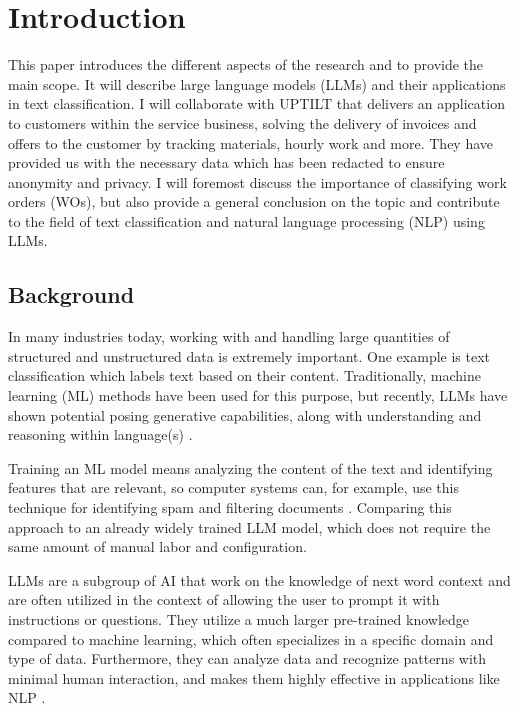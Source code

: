 \section{Introduction}

This paper introduces the different aspects of the research and to provide the
main scope.
It will describe large language models (LLMs) and their applications in text
classification.
I will collaborate with UPTILT that delivers an application to customers within
the service business, solving the delivery of invoices and offers to the
customer by tracking materials, hourly work and more.
They have provided us with the necessary data which has been redacted to ensure
anonymity and privacy.
I will foremost discuss the importance of classifying work orders (WOs), but
also provide a general conclusion on the topic and contribute to the field of
text classification and natural language processing (NLP) using LLMs.

\subsection{Background}

In many industries today, working with and handling large quantities of
structured and unstructured data is extremely important.
One example is text classification which labels text based on their content.
Traditionally, machine learning (ML) methods have been used for this purpose,
but recently, LLMs have shown potential posing generative capabilities, along
with understanding and reasoning within language(s)
\cite{huang2024} \cite{zhang2024}.

Training an ML model means analyzing the content of the text and identifying
features that are relevant, so computer systems can, for example, use this
technique for identifying spam and filtering documents \cite{dalal2011}.
Comparing this approach to an already widely trained LLM model, which does not
require the same amount of manual labor and configuration.

LLMs are a subgroup of AI that work on the knowledge of next word context and
are often utilized in the context of allowing the user to prompt it with
instructions or questions.
They utilize a much larger pre-trained knowledge compared to machine learning,
which often specializes in a specific domain and type of data.
Furthermore, they can analyze data and recognize patterns with minimal human
interaction, and makes them highly effective in applications like NLP
\cite{andersson2024}.

